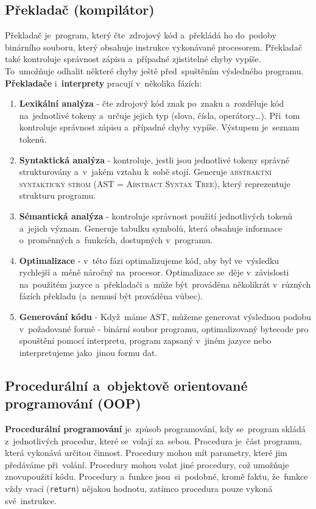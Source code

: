 \documentclass[14pt,a4paper]{article}
\begin{document}
        \subsection{Překladač (kompilátor)}
        Překladač je~program, který čte~zdrojový kód a~překládá ho do~podoby binárního souboru, který obsahuje instrukce vykonávané procesorem. Překladač také kontroluje správnost zápisu a~případné zjistitelné chyby vypíše. To~umožňuje odhalit některé chyby ještě před~spuštěním výsledného programu.
        \textbf{Překladače} i~\textbf{interprety} pracují v~několika fázích:
        \begin{enumerate}
            \item \textbf{Lexikální analýza} - čte zdrojový kód znak po~znaku a~rozděluje kód na~jednotlivé tokeny a~určuje jejich typ (slova, čísla, operátory\dots). Při~tom kontroluje správnost zápisu a~případné chyby vypíše. Výstupem je~seznam tokenů.
            \item \textbf{Syntaktická analýza} - kontroluje, jestli jsou jednotlivé tokeny správně strukturovány a~v~jakém vztahu k~sobě stojí. Generuje \textsc{abstraktní syntaktický strom (AST = Abstract Syntax Tree)}, který reprezentuje strukturu programu.
            \item \textbf{Sémantická analýza} - kontroluje správnost použití jednotlivých tokenů a~jejich význam. Generuje tabulku symbolů, která obsahuje informace o~proměnných a~funkcích, dostupných v~programu.
            \item \textbf{Optimalizace} - v~této fázi optimalizujeme kód, aby byl ve~výsledku rychlejší a~méně náročný na~procesor. Optimalizace se~děje v~závislosti na~použitém jazyce a~překladači a~může být~prováděna několikrát v~různých fázích překladu (a~nemusí být prováděna vůbec).
            \item \textbf{Generování kódu} - Když~máme \textsc{AST}, můžeme generovat výslednou podobu v~požadované formě - binární soubor programu, optimalizovaný bytecode pro spouštění pomocí interpretu, program zapsaný v~jiném jazyce nebo interpretujeme jako~jinou formu dat.
        \end{enumerate} \parencite{baeldungCompilersWork}

        \subsection{Procedurální a~objektově orientované programování (OOP)}
        \textbf{Procedurální programování} je~způsob programování, kdy se~program skládá z~jednotlivých procedur, které se~volají za~sebou. Procedura je~část programu, která vykonává určitou činnost. Procedury mohou mít parametry, které jim předáváme při~volání. Procedury mohou volat jiné procedury, což umožňuje znovupoužití kódu. Procedury a~funkce jsou~si~podobné, kromě faktu, že~funkce vždy vrací (\texttt{return}) nějakou hodnotu, zatímco procedura pouze vykoná své~instrukce. \parencite{procedural:wiki}
        
\end{document}
